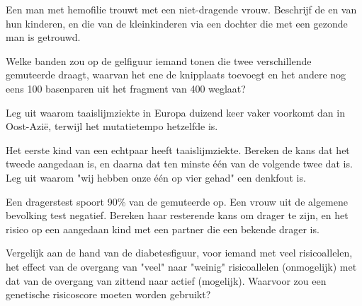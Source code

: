 \begin{exercise}[$\star\star$]\label{exo:g11:genes-and-disease:9}
Een man met hemofilie trouwt met een niet-dragende vrouw. Beschrijf de
 en  van hun kinderen, en die van de kleinkinderen via
een dochter die met een gezonde man is getrouwd.
\end{exercise}

\begin{exercise}[$\star\star$]\label{exo:g11:genes-and-disease:10}
Welke banden zou op de gelfiguur iemand tonen die twee verschillende
gemuteerde  draagt, waarvan het ene de knipplaats toevoegt en het
andere nog eens 100 basenparen uit het fragment van 400 weglaat?
\end{exercise}

\begin{exercise}[$\star\star$]\label{exo:g11:genes-and-disease:11}
Leg uit waarom taaislijmziekte in Europa duizend keer vaker voorkomt dan
in Oost-Azië, terwijl het mutatietempo hetzelfde is.
\end{exercise}

\begin{exercise}[$\star\star\star$]\label{exo:g11:genes-and-disease:12}
Het eerste kind van een echtpaar heeft taaislijmziekte. Bereken de kans
dat het tweede aangedaan is, en daarna dat ten minste één van de volgende
twee dat is. Leg uit waarom "wij hebben onze één op vier gehad" een
denkfout is.
\end{exercise}

\begin{exercise}[$\star\star\star$]\label{exo:g11:genes-and-disease:13}
Een dragerstest spoort 90\% van de gemuteerde  op. Een vrouw uit
de algemene bevolking test negatief. Bereken haar resterende kans om
drager te zijn, en het risico op een aangedaan kind met een partner die
een bekende drager is.
\end{exercise}

\begin{exercise}[$\star\star\star$]\label{exo:g11:genes-and-disease:14}
Vergelijk aan de hand van de diabetesfiguur, voor iemand met veel
risicoallelen, het effect van de overgang van "veel" naar "weinig"
risicoallelen (onmogelijk) met dat van de overgang van zittend naar
actief (mogelijk). Waarvoor zou een genetische risicoscore moeten worden
gebruikt?
\end{exercise}

